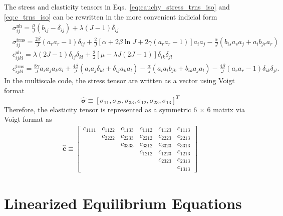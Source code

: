 \documentclass[12pt,aps,pre]{revtex4}
\begin{document}
The stress and elasticity tensors in Eqs.\ \eqref{eq:cauchy_stress_trns_iso} and \eqref{eq:c_trns_iso} can be rewritten in the more convenient indicial form
%
\begin{align}
&\sigma^{\text{nh}}_{ij} = \frac{\mu}{J}(b_{ij} - \delta_{ij}) + \lambda(J-1)\delta_{ij} \nonumber\\
%
&\sigma^{\text{trns}}_{ij} = \frac{2\beta}{J}(a_r a_r - 1)\delta_{ij} + \frac{2}{J}[\alpha+2\beta\ln J+2\gamma(a_r a_r -1)]a_i a_j - \frac{\alpha}{J}(b_{is}a_s a_j+a_i b_{jr}a_r) \nonumber\\
%
&c^{\text{nh}}_{ijkl} = \lambda(2J-1)\delta_{ij}\delta_{kl} + \frac{2}{J}[\mu - \lambda J(2J-1)]\delta_{ik}\delta_{jl} \nonumber\\
%
&c^{\text{trns}}_{ijkl} = \frac{8\gamma}{J}a_i a_j a_k a_l + \frac{4\beta}{J}(a_i a_j \delta_{kl} + \delta_{ij}a_k a_l) - \frac{\alpha}{J}(a_i a_l b_{jk} + b_{ik}a_j a_l) - \frac{4\beta}{J}(a_r a_r - 1)\delta_{ik}\delta_{jl}.
\label{eq:inidicial_form}
\end{align}
%
In the multiscale code, the stress tensor are written as a vector using Voigt format
%
\begin{equation}
\hat{\pmb{\sigma}} \equiv  [\sigma_{11}, \sigma_{22}, \sigma_{33}, \sigma_{12}, \sigma_{23}, \sigma_{13}]^T
\end{equation}
%
Therefore, the elasticity tensor is represented as a symmetric 6 $\times$ 6 matrix via Voigt format as
%
\begin{eqnarray}
\hat{\pmb{c}} \equiv 
\begin{bmatrix}
c_{1111} & c_{1122} & c_{1133} & c_{1112} & c_{1123} & c_{1113} \\
              & c_{2222} & c_{2233} & c_{2212} & c_{2223} & c_{2213} \\
              &                & c_{3333} & c_{3312} & c_{3323} & c_{3313} \\
              &                &                & c_{1212} & c_{1223} & c_{1213} \\
              &                &                &                & c_{2323} & c_{2313} \\
              &                &                &                &                & c_{1313}       
\end{bmatrix}
\end{eqnarray}
% 
\section{Linearized Equilibrium Equations}
\end{document}
